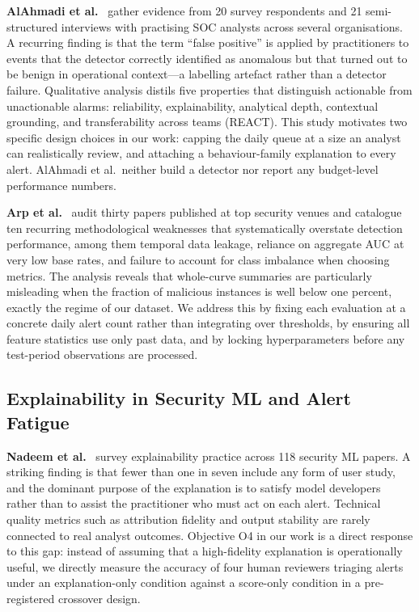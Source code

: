 \textbf{AlAhmadi et al.}~\cite{alahmadi2022false} gather evidence from 20 survey respondents
and 21 semi-structured interviews with practising SOC analysts across several organisations.
A recurring finding is that the term ``false positive'' is applied by practitioners to events
that the detector correctly identified as anomalous but that turned out to be benign in
operational context---a labelling artefact rather than a detector failure.
Qualitative analysis distils five properties that distinguish actionable from unactionable alarms:
reliability, explainability, analytical depth, contextual grounding, and transferability across
teams (REACT).
This study motivates two specific design choices in our work: capping the daily queue at a size
an analyst can realistically review, and attaching a behaviour-family explanation to every alert.
AlAhmadi et al.\ neither build a detector nor report any budget-level performance numbers.

\textbf{Arp et al.}~\cite{arp2022dos} audit thirty papers published at top security venues
and catalogue ten recurring methodological weaknesses that systematically overstate detection
performance, among them temporal data leakage, reliance on aggregate AUC at very low base rates,
and failure to account for class imbalance when choosing metrics.
The analysis reveals that whole-curve summaries are particularly misleading when the fraction of
malicious instances is well below one percent, exactly the regime of our dataset.
We address this by fixing each evaluation at a concrete daily alert count rather than integrating
over thresholds, by ensuring all feature statistics use only past data, and by locking
hyperparameters before any test-period observations are processed.

\subsection{Explainability in Security ML and Alert Fatigue}

\textbf{Nadeem et al.}~\cite{nadeem2023sok} survey explainability practice across 118 security
ML papers. A striking finding is that fewer than one in seven include any form of user study,
and the dominant purpose of the explanation is to satisfy model developers rather than to assist
the practitioner who must act on each alert. Technical quality metrics such as attribution
fidelity and output stability are rarely connected to real analyst outcomes.
Objective O4 in our work is a direct response to this gap: instead of assuming that a
high-fidelity explanation is operationally useful, we directly measure the accuracy of four
human reviewers triaging alerts under an explanation-only condition against a score-only
condition in a pre-registered crossover design.


